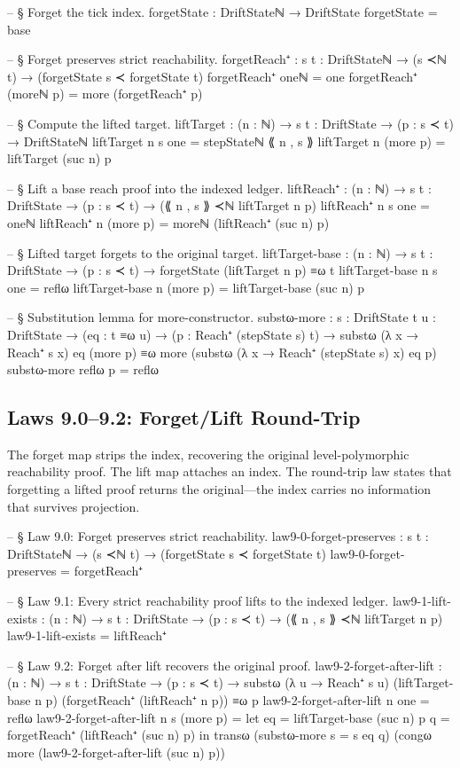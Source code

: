 \documentclass[11pt,a4paper]{book}
\begin{document}
\begin{code}
-- § Forget the tick index.
forgetState : DriftStateℕ → DriftState
forgetState = base

-- § Forget preserves strict reachability.
forgetReach⁺ : {s t : DriftStateℕ} → (s ≺ℕ t) → (forgetState s ≺ forgetState t)
forgetReach⁺ oneℕ = one
forgetReach⁺ (moreℕ p) = more (forgetReach⁺ p)

-- § Compute the lifted target.
liftTarget : (n : ℕ) → {s t : DriftState} → (p : s ≺ t) → DriftStateℕ
liftTarget n {s} one = stepStateℕ ⟪ n , s ⟫
liftTarget n (more p) = liftTarget (suc n) p

-- § Lift a base reach proof into the indexed ledger.
liftReach⁺ : (n : ℕ) → {s t : DriftState} → (p : s ≺ t) → (⟪ n , s ⟫ ≺ℕ liftTarget n p)
liftReach⁺ n {s} one = oneℕ
liftReach⁺ n (more p) = moreℕ (liftReach⁺ (suc n) p)

-- § Lifted target forgets to the original target.
liftTarget-base : (n : ℕ) → {s t : DriftState} → (p : s ≺ t) → forgetState (liftTarget n p) ≡ω t
liftTarget-base n {s} one = reflω
liftTarget-base n (more p) = liftTarget-base (suc n) p

-- § Substitution lemma for more-constructor.
substω-more :
  {s : DriftState} {t u : DriftState} →
  (eq : t ≡ω u) →
  (p : Reach⁺ (stepState s) t) →
  substω (λ x → Reach⁺ s x) eq (more p) ≡ω more (substω (λ x → Reach⁺ (stepState s) x) eq p)
substω-more reflω p = reflω
\end{code}

\subsection{Laws 9.0--9.2: Forget/Lift Round-Trip}

The forget map strips the index, recovering the original level-polymorphic reachability proof.
The lift map attaches an index.
The round-trip law states that forgetting a lifted proof returns the original---the index carries no information that survives projection.

\begin{code}
-- § Law 9.0: Forget preserves strict reachability.
law9-0-forget-preserves : {s t : DriftStateℕ} → (s ≺ℕ t) → (forgetState s ≺ forgetState t)
law9-0-forget-preserves = forgetReach⁺

-- § Law 9.1: Every strict reachability proof lifts to the indexed ledger.
law9-1-lift-exists : (n : ℕ) → {s t : DriftState} → (p : s ≺ t) → (⟪ n , s ⟫ ≺ℕ liftTarget n p)
law9-1-lift-exists = liftReach⁺

-- § Law 9.2: Forget after lift recovers the original proof.
law9-2-forget-after-lift :
  (n : ℕ) → {s t : DriftState} →
  (p : s ≺ t) →
  substω (λ u → Reach⁺ s u) (liftTarget-base n p) (forgetReach⁺ (liftReach⁺ n p)) ≡ω p
law9-2-forget-after-lift n one = reflω
law9-2-forget-after-lift n {s} (more p) =
  let
    eq = liftTarget-base (suc n) p
    q  = forgetReach⁺ (liftReach⁺ (suc n) p)
  in
  transω
    (substω-more {s = s} eq q)
    (congω more (law9-2-forget-after-lift (suc n) p))
\end{code}
\end{document}
